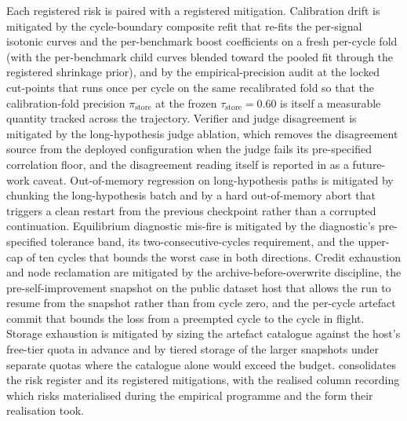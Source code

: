 Each registered risk is paired with a registered mitigation. Calibration drift is mitigated by the cycle-boundary composite refit that re-fits the per-signal isotonic curves and the per-benchmark boost coefficients on a fresh per-cycle fold (with the per-benchmark child curves blended toward the pooled fit through the registered shrinkage prior), and by the empirical-precision audit at the locked cut-points that runs once per cycle on the same recalibrated fold so that the calibration-fold precision $\pi_{\text{store}}$ at the frozen $\tau_{\text{store}}=0.60$ is itself a measurable quantity tracked across the trajectory. Verifier and judge disagreement is mitigated by the long-hypothesis judge ablation, which removes the disagreement source from the deployed configuration when the judge fails its pre-specified correlation floor, and the disagreement reading itself is reported in  as a future-work caveat. Out-of-memory regression on long-hypothesis paths is mitigated by chunking the long-hypothesis batch and by a hard out-of-memory abort that triggers a clean restart from the previous checkpoint rather than a corrupted continuation. Equilibrium diagnostic mis-fire is mitigated by the diagnostic's pre-specified tolerance band, its two-consecutive-cycles requirement, and the upper-cap of ten cycles that bounds the worst case in both directions. Credit exhaustion and node reclamation are mitigated by the archive-before-overwrite discipline, the pre-self-improvement snapshot on the public dataset host that allows the run to resume from the snapshot rather than from cycle zero, and the per-cycle artefact commit that bounds the loss from a preempted cycle to the cycle in flight. Storage exhaustion is mitigated by sizing the artefact catalogue against the host's free-tier quota in advance and by tiered storage of the larger snapshots under separate quotas where the catalogue alone would exceed the budget.  consolidates the risk register and its registered mitigations, with the realised column recording which risks materialised during the empirical programme and the form their realisation took.

